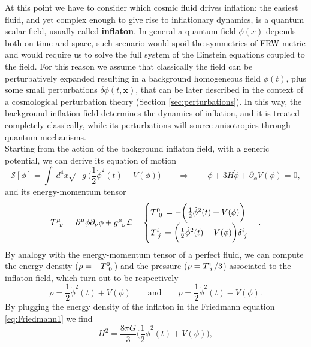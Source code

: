 At this point we have to consider which cosmic fluid drives inflation: the easiest fluid, and yet complex enough to give rise to inflationary dynamics, is a quantum scalar field, usually called \textbf{inflaton}. In general a quantum field $\phi(x)$ depends both on time and space, such scenario would spoil the symmetries of FRW metric and would require us to solve the full system of the Einstein equations coupled to the field. For this reason we assume that classically the field can be perturbatively expanded resulting in a background homogeneous field $\phi(t)$, plus some small perturbations $\delta \phi(t,\mathbf x)$, that can be later described in the context of a cosmological perturbation theory (Section \ref{sec:perturbations}). In this way, the background  inflation field determines the dynamics of inflation, and it is treated completely classically, while its perturbations will source anisotropies through quantum mechanisms.\\
Starting from the action of the background inflaton field, with a generic potential, we can derive its equation of motion
\begin{equation}
    \mathcal{S}[\phi]=\int\ d^4x\sqrt{-g}\bigg(\frac{1}{2}\dot\phi^2(t)-V(\phi)\bigg)\qquad\Rightarrow\qquad\ddot\phi+3H\dot \phi+\partial_\phi V(\phi)=0,\label{eq:motion_inflaton}
\end{equation}
and its energy-momentum tensor
\begin{equation}
   \tensor{T}{^\mu_\nu}=\partial^\mu\phi\partial_\nu\phi+\tensor{g}{^\mu_\nu}\mathcal{L}=
   \begin{cases}
    \tensor{T}{^0_0}=-\bigg(\frac{1}{2}\dot\phi^2(t)+V(\phi)\bigg)\\
    \tensor{T}{^i_j}=\bigg(\frac{1}{2}\dot\phi^2(t)-V(\phi)\bigg)\tensor{\delta}{^i_j}\\
   \end{cases}.
\end{equation}
By analogy with the energy-momentum tensor of a perfect fluid, we can compute the energy density ($\rho=-\tensor{T}{^0_0}$) and the pressure ($p=\tensor{T}{^i_i}/3$) associated to the inflaton field, which turn out to be respectively
\begin{equation}
    \label{eq_rho_p_inflaton}
    \rho=\frac{1}{2}\dot\phi^2(t)+V(\phi)\qquad\text{and}\qquad p=\frac{1}{2}\dot\phi^2(t)-V(\phi).
\end{equation}
By plugging the energy density of the inflaton in the Friedmann equation \eqref{eq:Friedmann1} we find
\begin{equation}
    H^2=\frac{8\pi G}{3}\bigg(\frac{1}{2}\dot\phi^2(t)+V(\phi)\bigg),
    \label{eq:Friedmann_inflaton}
\end{equation}
